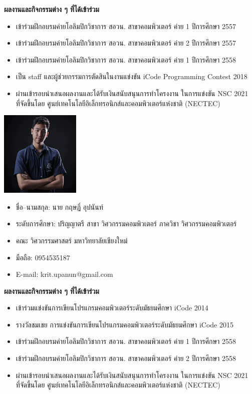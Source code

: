 \documentclass[final]{cpecmu}
\begin{document}
\begin{biosketch}
\noindent \textbf{ผลงานและกิจกรรมต่าง ๆ ที่ได้เข้าร่วม}
\begin{itemize}
  \item เข้าร่วมฝึกอบรมค่ายโอลิมปิกวิชาการ สอวน. สาขาคอมพิวเตอร์ ค่าย 1 ปีการศึกษา 2557
  \item เข้าร่วมฝึกอบรมค่ายโอลิมปิกวิชาการ สอวน. สาขาคอมพิวเตอร์ ค่าย 2 ปีการศึกษา 2557
  \item เข้าร่วมฝึกอบรมค่ายโอลิมปิกวิชาการ สอวน. สาขาคอมพิวเตอร์ ค่าย 1 ปีการศึกษา 2558
  \item เป็น staff และผู้ช่วยกรรมการตัดสินในงานแข่งขัน iCode Programming Contest 2018
  \item ผ่านเข้ารอบนำเสนอผลงานและได้รับเงินสนับสนุนการทำโครงงาน ในการแข่งขัน NSC 2021\\
  ที่จัดขึ้นโดย ศูนย์เทคโนโลยีอิเล็กทรอนิกส์และคอมพิวเตอร์แห่งชาติ (NECTEC)
\end{itemize}
\newpage
\begin{center}
  \includegraphics[width=1.5in]{./images/krit_pic_resize.png}
\end{center}
\begin{itemize}[label={},leftmargin=*,labelsep=0pt]
  \item ชื่อ--นามสกุล: นาย กฤษฏิ์ อุปนันท์
  \item ระดับการศึกษา: ปริญญาตรี สาขา วิศวกรรมคอมพิวเตอร์ ภาควิชา วิศวกรรมคอมพิวเตอร์
  \item คณะ วิศวกรรมศาสตร์ มหาวิทยาลัยเชียงใหม่
  \item มือถือ: 0954535187
  \item E-mail: krit.upanun@gmail.com
\end{itemize}


\noindent \textbf{ผลงานและกิจกรรมต่าง ๆ ที่ได้เข้าร่วม}
\begin{itemize}
  \item เข้าร่วมแข่งขันการเขียนโปรแกรมคอมพิวเตอร์ระดับมัธยมศึกษา iCode 2014
  \item รางวัลชมเชย การแข่งขันการเขียนโปรแกรมคอมพิวเตอร์ระดับมัธยมศึกษา iCode 2015
  \item เข้าร่วมฝึกอบรมค่ายโอลิมปิกวิชาการ สอวน. สาขาคอมพิวเตอร์ ค่าย 1 ปีการศึกษา 2558
  \item เข้าร่วมฝึกอบรมค่ายโอลิมปิกวิชาการ สอวน. สาขาคอมพิวเตอร์ ค่าย 2 ปีการศึกษา 2558
  \item ผ่านเข้ารอบนำเสนอผลงานและได้รับเงินสนับสนุนการทำโครงงาน ในการแข่งขัน NSC 2021\\
  ที่จัดขึ้นโดย ศูนย์เทคโนโลยีอิเล็กทรอนิกส์และคอมพิวเตอร์แห่งชาติ (NECTEC)
\end{itemize}

\end{biosketch}
\fi %
\end{document}
